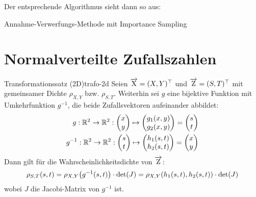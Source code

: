 Der entsprechende Algorithmus sieht dann so aus:

\begin{algorithm}[h!]


\caption{Annahme-Verwerfungs-Methode mit Importance Sampling}\label{algo:av-methode-is}
\end{algorithm}

\section{Normalverteilte Zufallszahlen}

\begin{theorem}{Transformationssatz (2D)}{trafo-2d}
Seien $\overrightarrow{\mathrm{X}} = (X, Y)^\top$ und $\overrightarrow{\mathrm{Z}} = (S,T)^\top$
 mit gemeinsamer Dichte
$\rho_{X,Y}$ bzw. $\rho_{S,T}$. Weiterhin sei $g$ eine bijektive Funktion mit
Umkehrfunktion $g^{-1}$, die beide Zufallsvektoren aufeinander
abbildet:
\begin{align*}
g: \mathbb{R}^2\to\mathbb{R}^2: \begin{pmatrix}x\\y\end{pmatrix}\mapsto
  \begin{pmatrix}g_1(x,y)\\g_2(x,y)\end{pmatrix} =
  \begin{pmatrix}s\\t\end{pmatrix} \\
g^{-1}: \mathbb{R}^2\to\mathbb{R}^2: \begin{pmatrix}s\\t\end{pmatrix}\mapsto
  \begin{pmatrix}h_1(s,t)\\h_2(s, t)\end{pmatrix} =
  \begin{pmatrix}x\\y\end{pmatrix}
\end{align*}
Dann gilt für die Wahrscheinlichkeitsdichte von $\overrightarrow{\mathrm{Z}}$:
\[
\rho_{S,T}(s,t) = \rho_{X,Y}\big(g^{-1}(s,t)\big)\cdot\operatorname{det}(J) =
  \rho_{X,Y}(h_1(s,t), h_2(s,t)) \cdot \operatorname{det}(J)
\]
wobei $J$ die Jacobi-Matrix von $g^{-1}$ ist.
\end{theorem}

